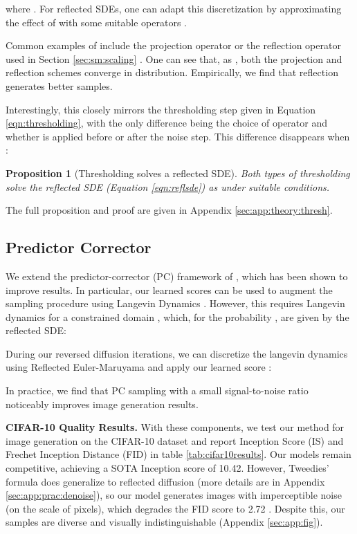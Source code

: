 \documentclass{article}
\theoremstyle{plain}
\newtheorem{proposition}[theorem]{Proposition}
\theoremstyle{definition}
\theoremstyle{remark}
\begin{document}
where . For reflected SDEs, one can adapt this discretization by approximating the effect of  with some suitable operators .

Common examples of  include the projection operator  \citep{Liu1993NumericalAT} or the reflection operator  used in Section \ref{sec:sm:scaling} \citep{Schuss2013BrownianDA}. One can see that, as , both the projection and reflection schemes converge in distribution. Empirically, we find that reflection generates better samples.

Interestingly, this closely mirrors the thresholding step given in Equation \ref{eqn:thresholding}, with the only difference being the choice of operator  and whether  is applied before or after the noise step. This difference disappears when :
\begin{proposition}[Thresholding solves a reflected SDE]
    Both types of thresholding solve the reflected SDE (Equation \ref{eqn:reflsde}) as  under suitable conditions.
\end{proposition}
The full proposition and proof are given in Appendix \ref{sec:app:theory:thresh}.

\subsection{Predictor Corrector}

We extend the predictor-corrector (PC) framework of \citet{Song2020ScoreBasedGM}, which has been shown to improve results. In particular, our learned scores can be used to augment the sampling procedure using Langevin Dynamics \citep{Song2019GenerativeMB}. However, this requires Langevin dynamics for a constrained domain \citep{Bubeck2015FiniteTimeAO}, which, for the probability , are given by the reflected SDE:

During our reversed diffusion iterations, we can discretize the langevin dynamics using Reflected Euler-Maruyama and apply our learned score :

In practice, we find that PC sampling with a small signal-to-noise ratio noticeably improves image generation results.

\textbf{CIFAR-10 Quality Results.} With these components, we test our method for image generation on the CIFAR-10 dataset and report Inception Score (IS) \citep{Salimans2016ImprovedTF} and Frechet Inception Distance (FID) \citep{Heusel2017GANsTB} in table \ref{tab:cifar10results}. Our models remain competitive, achieving a SOTA Inception score of 10.42. However, Tweedies' formula does generalize to reflected diffusion \citep{Efron2011TweediesFA} (more details are in Appendix \ref{sec:app:prac:denoise}), so our model generates images with imperceptible noise (on the scale of  pixels), which degrades the FID score to 2.72 \citep{JolicoeurMartineau2020AdversarialSM}. Despite this, our samples are diverse and visually indistinguishable (Appendix \ref{sec:app:fig}).
\end{document}
